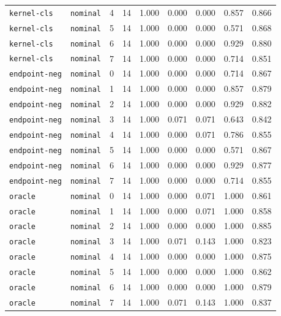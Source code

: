 \documentclass{article}
\begin{document}
\begin{center}
{\begin{tabular}{llllccccc}
\texttt{kernel-cls} & \texttt{nominal} & 4 & 14 & 1.000 & 0.000 & 0.000 & 0.857 & 0.866 \\
\texttt{kernel-cls} & \texttt{nominal} & 5 & 14 & 1.000 & 0.000 & 0.000 & 0.571 & 0.868 \\
\texttt{kernel-cls} & \texttt{nominal} & 6 & 14 & 1.000 & 0.000 & 0.000 & 0.929 & 0.880 \\
\texttt{kernel-cls} & \texttt{nominal} & 7 & 14 & 1.000 & 0.000 & 0.000 & 0.714 & 0.851 \\
\texttt{endpoint-neg} & \texttt{nominal} & 0 & 14 & 1.000 & 0.000 & 0.000 & 0.714 & 0.867 \\
\texttt{endpoint-neg} & \texttt{nominal} & 1 & 14 & 1.000 & 0.000 & 0.000 & 0.857 & 0.879 \\
\texttt{endpoint-neg} & \texttt{nominal} & 2 & 14 & 1.000 & 0.000 & 0.000 & 0.929 & 0.882 \\
\texttt{endpoint-neg} & \texttt{nominal} & 3 & 14 & 1.000 & 0.071 & 0.071 & 0.643 & 0.842 \\
\texttt{endpoint-neg} & \texttt{nominal} & 4 & 14 & 1.000 & 0.000 & 0.071 & 0.786 & 0.855 \\
\texttt{endpoint-neg} & \texttt{nominal} & 5 & 14 & 1.000 & 0.000 & 0.000 & 0.571 & 0.867 \\
\texttt{endpoint-neg} & \texttt{nominal} & 6 & 14 & 1.000 & 0.000 & 0.000 & 0.929 & 0.877 \\
\texttt{endpoint-neg} & \texttt{nominal} & 7 & 14 & 1.000 & 0.000 & 0.000 & 0.714 & 0.855 \\
\texttt{oracle} & \texttt{nominal} & 0 & 14 & 1.000 & 0.000 & 0.071 & 1.000 & 0.861 \\
\texttt{oracle} & \texttt{nominal} & 1 & 14 & 1.000 & 0.000 & 0.071 & 1.000 & 0.858 \\
\texttt{oracle} & \texttt{nominal} & 2 & 14 & 1.000 & 0.000 & 0.000 & 1.000 & 0.885 \\
\texttt{oracle} & \texttt{nominal} & 3 & 14 & 1.000 & 0.071 & 0.143 & 1.000 & 0.823 \\
\texttt{oracle} & \texttt{nominal} & 4 & 14 & 1.000 & 0.000 & 0.000 & 1.000 & 0.875 \\
\texttt{oracle} & \texttt{nominal} & 5 & 14 & 1.000 & 0.000 & 0.000 & 1.000 & 0.862 \\
\texttt{oracle} & \texttt{nominal} & 6 & 14 & 1.000 & 0.000 & 0.000 & 1.000 & 0.879 \\
\texttt{oracle} & \texttt{nominal} & 7 & 14 & 1.000 & 0.071 & 0.143 & 1.000 & 0.837 \\
\bottomrule
\end{tabular}%
}
\end{center}
\end{document}
